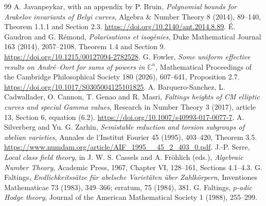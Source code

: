 \documentclass[11pt]{article}
\theoremstyle{definition}
\theoremstyle{remark}
\begin{document}
\begin{thebibliography}{99}
 A. Javanpeykar, with an appendix by P. Bruin,
\emph{Polynomial bounds for Arakelov invariants of Belyi curves},
Algebra \& Number Theory 8 (2014), 89--140,
Theorem 1.1.1 and Section 2.3.
\url{https://doi.org/10.2140/ant.2014.8.89}.
 \'E. Gaudron and G. R\'emond,
\emph{Polarisations et isog\'enies}, Duke Mathematical Journal
163 (2014), 2057--2108, Theorem 1.4 and Section 9.
\url{https://doi.org/10.1215/00127094-2782528}.
 G. Fowler, \emph{Some uniform effective results on
Andr\'e--Oort for sums of powers in $\mathbb C^n$}, Mathematical
Proceedings of the Cambridge Philosophical Society 180 (2026),
607--641, Proposition 2.7.
\url{https://doi.org/10.1017/S0305004125101825}.
 A. Barquero-Sanchez, L. Cadwallader, O. Cannon,
T. Genao and R. Masri, \emph{Faltings heights of CM elliptic curves
and special Gamma values}, Research in Number Theory 3 (2017),
article 13, Section 6, equation (6.2).
\url{https://doi.org/10.1007/s40993-017-0077-7}.
 A. Silverberg and Yu. G. Zarhin,
\emph{Semistable reduction and torsion subgroups of abelian varieties},
Annales de l'Institut Fourier 45 (1995), 403--420, Theorem 3.5.
\url{https://www.numdam.org/article/AIF_1995__45_2_403_0.pdf}.
 J.-P. Serre, \emph{Local class field theory},
in J. W. S. Cassels and A. Fr\"ohlich (eds.), \emph{Algebraic Number Theory},
Academic Press, 1967, Chapter VI, 128--161, Sections 4.1--4.3.
 G. Faltings, \emph{Endlichkeitss\"atze f\"ur
abelsche Variet\"aten \"uber Zahlk\"orpern}, Inventiones Mathematicae
73 (1983), 349--366; erratum, 75 (1984), 381.
 G. Faltings, \emph{$p$-adic Hodge theory},
Journal of the American Mathematical Society 1 (1988), 255--299.


\end{thebibliography}
\end{document}
